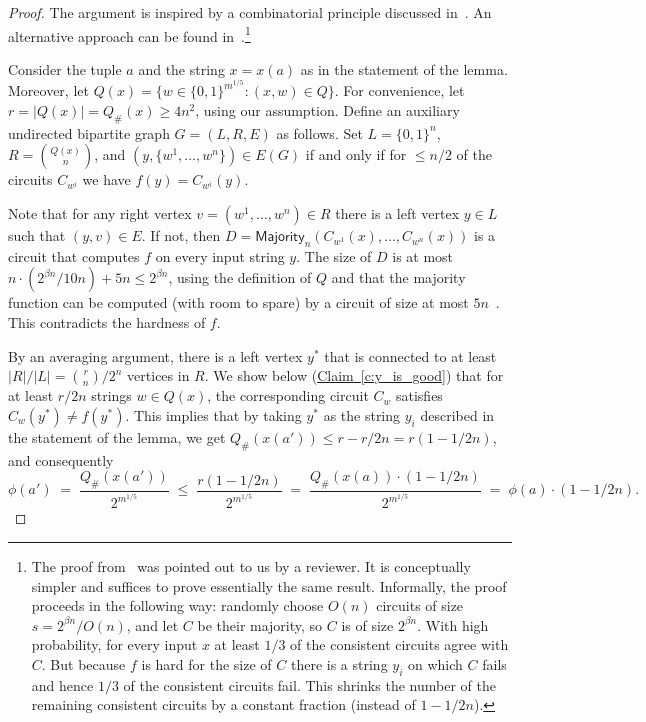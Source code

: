 \documentclass[11pt]{article}
\numberwithin{equation}{section}
\theoremstyle{definition}
\theoremstyle{plain}
\newcommand{\expref}[2]{\hyperref[#2]{#1~\ref{#2}}}
\begin{document}
\begin{proof} The argument is inspired by a combinatorial principle discussed in~\cite{krajivcek1995extensions}. An alternative approach can be found in~\cite{DBLP:journals/jcss/BshoutyCGKT96}.\footnote{The proof from~\cite{DBLP:journals/jcss/BshoutyCGKT96} was pointed out to us by a reviewer. It is conceptually simpler and suffices to prove essentially the same result. Informally, the proof proceeds in the following way: randomly choose $O(n)$ circuits of size $s=2^{\beta n}/O(n)$, and let $C$ be their majority, so $C$ is of size $2^{\beta n}$. With high probability, for every input $x$ at least $1/3$ of the consistent circuits agree with $C$. But because $f$ is hard for the size of $C$ there is a string $y_i$ on which $C$ fails and hence $1/3$ of the consistent circuits fail. This shrinks the number of the remaining consistent circuits by a constant fraction (instead of $1-1/2n$).
}

Consider the tuple $a$ and the string $x = x(a)$ as in the statement of the lemma. Moreover, let $Q(x) =  \{ w \in \{0,1\}^{m^{1/5}} \colon (x,w) \in Q\}$. For convenience, let $r = |Q(x)| = Q_{\#}(x) \geq 4n^2$, using our assumption. Define an auxiliary undirected bipartite graph $G = (L,R,E)$ as follows. Set $L = \{0,1\}^n$, $R = \binom{Q(x)}{n}$, and $(y,\{w^1, \ldots, w^n\}) \in E(G)$ if and only if for $\leq n/2$ of the circuits $C_{w^i}$ we have $f(y) = C_{w^i}(y)$.

Note that for any right vertex $v = (w^1, \ldots, w^n) \in R$ there is a left vertex $y \in L$ such that $(y,v) \in E$. If not, then $D = \mathsf{Majority}_n(C_{w^1}(x), \ldots, C_{w^n}(x))$ is a circuit that computes $f$ on every input string $y$. The size of $D$ is at most $n \cdot (2^{\beta n}/10n) + 5n \leq 2^{\beta n}$, using the definition of $Q$ and that the majority function can be computed (with room to spare) by a circuit of size at most $5n$~\cite{DBLP:books/teu/Wegener87}. This contradicts the hardness of $f$.

By an averaging argument, there is a left vertex $y^*$ that is connected to at least $|R|/|L| = \binom{r}{n}/2^n$ vertices in $R$. We show below (\expref{Claim}{c:y_is_good}) that for at least $r/2n$ strings $w \in Q(x)$, the corresponding circuit $C_w$ satisfies $C_w(y^*) \neq f(y^*)$. This implies that by taking $y^*$ as the string $y_i$ described in the statement of the lemma, we get $Q_{\#}(x(a')) \leq r - r/2n = r(1 - 1/2n)$, and consequently 
$$\phi(a') \;=\; \frac{Q_{\#}(x(a'))}{2^{m^{1/5}}} \;\leq\; \frac{r(1 - 1/2n)}{2^{m^{1/5}}} \;=\; \frac{Q_{\#}(x(a))\cdot (1 - 1/2n)}{2^{m^{1/5}}} \;=\; \phi(a) \cdot (1 - 1/2n).$$


\end{proof}
\end{document}

